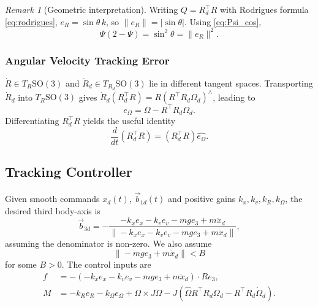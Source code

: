 \documentclass[11pt]{article}
\theoremstyle{remark}
\newtheorem{remark}{Remark}
\newcommand{\SO}{\mathrm{SO}(3)}
\newcommand{\hatmap}[1]{\widehat{#1}}
\newcommand{\hatexp}[1]{({#1})^\wedge}
\begin{document}
\begin{remark}[Geometric interpretation]
\label{remark:geom_interp}
Writing $Q = R_d^\top R$ with Rodrigues formula \eqref{eq:rodrigues}, $e_R = \sin\theta\, k$, so $\|e_R\| = |\sin\theta|$. Using \eqref{eq:Psi_cos},
\begin{equation}
\Psi(2 - \Psi) = \sin^2\theta = \|e_R\|^2.
\label{eq:Psi_eR}
\end{equation}
\end{remark}

\subsubsection{Angular Velocity Tracking Error}
$\dot R \in T_R\SO$ and $\dot R_d \in T_{R_d}\SO$ lie in different tangent spaces. Transporting $\dot R_d$ into $T_R\SO$ gives $\dot R_d(R_d^\top R) = R\hatexp{R^\top R_d \Omega_d}$, leading to
\begin{equation}
e_\Omega = \Omega - R^\top R_d \Omega_d.
\label{eq:eOm}
\end{equation}
Differentiating $R_d^\top R$ yields the useful identity
\begin{equation}
\frac{d}{dt}(R_d^\top R) = (R_d^\top R)\hatmap{e_\Omega}.
\label{eq:RdTR_dot}
\end{equation}

\subsection{Tracking Controller}
Given smooth commands $x_d(t)$, $\vec{b}_{1d}(t)$ and positive gains $k_x, k_v, k_R, k_\Omega$, the desired third body-axis is
\begin{equation}
    \vec{b}_{3d} = -\frac{-k_x e_x - k_v e_v - mge_3 + m\ddot{x}_d}{\|-k_x e_x - k_v e_v - mge_3 + m\ddot{x}_d\|},
    \label{eq:b3d}
\end{equation}
assuming the denominator is non-zero. We also assume
\begin{equation}
    \|-mge_3 + m\ddot{x}_d\| < B \label{eq:B_bound}
\end{equation}
for some $B>0$. The control inputs are
\begin{align}
    f &= -(-k_x e_x - k_v e_v - mge_3 + m\ddot{x}_d) \cdot Re_3, \label{eq:f} \\
    M &= -k_R e_R - k_\Omega e_\Omega + \Omega \times J\Omega - J(\hatmap{\Omega}R^\top R_d \Omega_d - R^\top R_d \dot{\Omega}_d). \label{eq:M}
\end{align}
\end{document}
